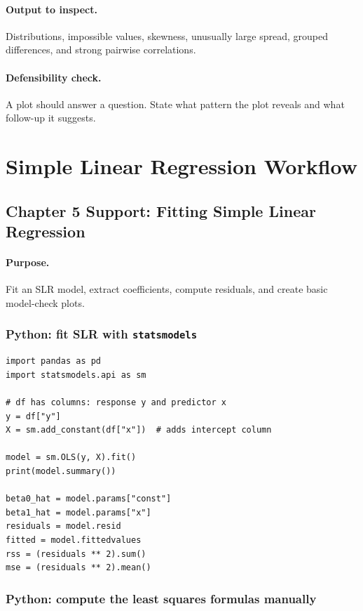 \paragraph{Output to inspect.} Distributions, impossible values, skewness, unusually large spread, grouped differences, and strong pairwise correlations.

\paragraph{Defensibility check.} A plot should answer a question.  State what pattern the plot reveals and what follow-up it suggests.

\section{Simple Linear Regression Workflow}
\label{app:cookbook-simple-linear-regression}

\subsection{Chapter 5 Support: Fitting Simple Linear Regression}
\label{app:ch05-software-cookbook-simple-linear-regression}

\paragraph{Purpose.} Fit an SLR model, extract coefficients, compute residuals, and create basic model-check plots.

\subsubsection*{Python: fit SLR with \texttt{statsmodels}}

\begin{verbatim}
import pandas as pd
import statsmodels.api as sm

# df has columns: response y and predictor x
y = df["y"]
X = sm.add_constant(df["x"])  # adds intercept column

model = sm.OLS(y, X).fit()
print(model.summary())

beta0_hat = model.params["const"]
beta1_hat = model.params["x"]
residuals = model.resid
fitted = model.fittedvalues
rss = (residuals ** 2).sum()
mse = (residuals ** 2).mean()
\end{verbatim}

\subsubsection*{Python: compute the least squares formulas manually}

